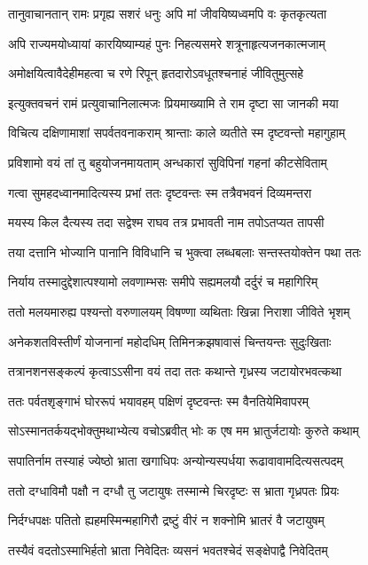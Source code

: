 \twolineshloka
{तानुवाचानतान् रामः प्रगृह्य सशरं धनुः}
{अपि मां जीवयिष्यध्वमपि वः कृतकृत्यता}


\twolineshloka
{अपि राज्यमयोध्यायां कारयिष्याम्यहं पुनः}
{निहत्यसमरे शत्रूनाहृत्यजनकात्मजाम्}


\twolineshloka
{अमोक्षयित्वावैदेहीमहत्वा च रणे रिपून्}
{हृतदारोऽवधूतश्चनाहं जीवितुमुत्सहे}


\twolineshloka
{इत्युक्तवचनं रामं प्रत्युवाचानिलात्मजः}
{प्रियमाख्यामि ते राम दृष्टा सा जानकी मया}


\twolineshloka
{विचित्य दक्षिणामाशां सपर्वतवनाकराम्}
{श्रान्ताः काले व्यतीते स्म दृष्टवन्तो महागुहाम्}


\twolineshloka
{प्रविशामो वयं तां तु बहुयोजनमायताम्}
{अन्धकारां सुविपिनां गहनां कीटसेविताम्}


\twolineshloka
{गत्वा सुमहदध्वानमादित्यस्य प्रभां ततः}
{दृष्टवन्तः स्म तत्रैवभवनं दिव्यमन्तरा}


\twolineshloka
{मयस्य किल दैत्यस्य तदा सद्वेश्म राघव}
{तत्र प्रभावती नाम तपोऽतप्यत तापसी}


\twolineshloka
{तया दत्तानि भोज्यानि पानानि विविधानि च}
{भुक्त्वा लब्धबलाः सन्तस्तयोक्तेन पथा ततः}


\twolineshloka
{निर्याय तस्मादुद्देशात्पश्यामो लवणाम्भसः}
{समीपे सह्यमलयौ दर्दुरं च महागिरिम्}


\twolineshloka
{ततो मलयमारुह्य पश्यन्तो वरुणालयम्}
{विषण्णा व्यथिताः खिन्ना निराशा जीविते भृशम्}


\twolineshloka
{अनेकशतविस्तीर्णं योजनानां महोदधिम्}
{तिमिनक्रझषावासं चिन्तयन्तः सुदुःखिताः}


\twolineshloka
{तत्रानशनसङ्कल्पं कृत्वाऽऽसीना वयं तदा}
{ततः कथान्ते गृध्रस्य जटायोरभवत्कथा}


\twolineshloka
{ततः पर्वतशृङ्गाभं घोररूपं भयावहम्}
{पक्षिणं दृष्टवन्तः स्म वैनतियेमिवापरम्}


\twolineshloka
{सोऽस्मानतर्कयद्भोक्तुमथाभ्येत्य वचोऽब्रवीत्}
{भोः क एष मम भ्रातुर्जटायोः कुरुते कथाम्}


\twolineshloka
{सपातिर्नाम तस्याहं ज्येष्ठो भ्राता खगाधिपः}
{अन्योन्यस्पर्धया रूढावावामदित्यसत्पदम्}


\twolineshloka
{ततो दग्धाविमौ पक्षौ न दग्धौ तु जटायुषः}
{तस्मान्मे चिरदृष्टः स भ्राता गृध्रपतः प्रियः}


\twolineshloka
{निर्दग्धपक्षः पतितो ह्यहमस्मिन्महागिरौ}
{द्रष्टुं वीरं न शक्नोमि भ्रातरं वै जटायुषम्}


\twolineshloka
{तस्यैवं वदतोऽस्माभिर्हतो भ्राता निवेदितः}
{व्यसनं भवतश्चेदं सङ्क्षेपाद्वै निवेदितम्}


